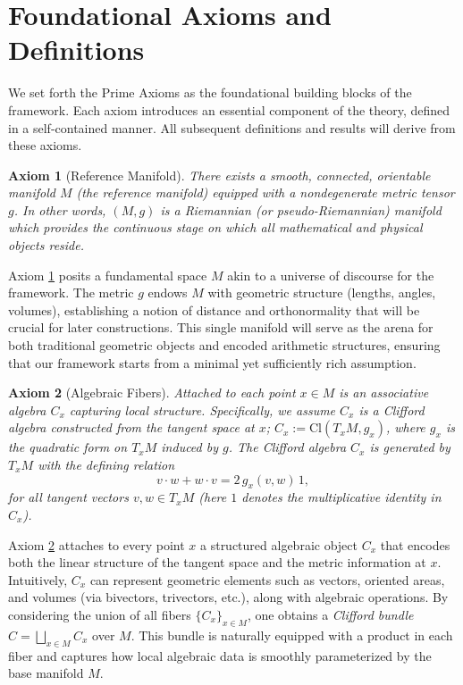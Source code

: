\documentclass[11pt]{article}
\newtheorem{axiom}{Axiom}
\begin{document}
\section{Foundational Axioms and Definitions}
We set forth the Prime Axioms as the foundational building blocks of the framework. Each axiom introduces an essential component of the theory, defined in a self-contained manner. All subsequent definitions and results will derive from these axioms.

\begin{axiom}[Reference Manifold]\label{ax:manifold}
There exists a smooth, connected, orientable manifold $M$ (the \emph{reference manifold}) equipped with a nondegenerate metric tensor $g$. In other words, $(M,g)$ is a Riemannian (or pseudo-Riemannian) manifold which provides the continuous stage on which all mathematical and physical objects reside.
\end{axiom}

Axiom \ref{ax:manifold} posits a fundamental space $M$ akin to a universe of discourse for the framework. The metric $g$ endows $M$ with geometric structure (lengths, angles, volumes), establishing a notion of distance and orthonormality that will be crucial for later constructions. This single manifold will serve as the arena for both traditional geometric objects and encoded arithmetic structures, ensuring that our framework starts from a minimal yet sufficiently rich assumption.

\begin{axiom}[Algebraic Fibers]\label{ax:fibers}
Attached to each point $x \in M$ is an associative algebra $C_x$ capturing local structure. Specifically, we assume $C_x$ is a Clifford algebra constructed from the tangent space at $x$; $C_x := \mathrm{Cl}(T_xM, g_x)$, where $g_x$ is the quadratic form on $T_xM$ induced by $g$. The Clifford algebra $C_x$ is generated by $T_xM$ with the defining relation 
\[v \cdot w + w \cdot v = 2\,g_x(v,w)\,1,\] 
for all tangent vectors $v,w \in T_xM$ (here $1$ denotes the multiplicative identity in $C_x$).
\end{axiom}

Axiom \ref{ax:fibers} attaches to every point $x$ a structured algebraic object $C_x$ that encodes both the linear structure of the tangent space and the metric information at $x$. Intuitively, $C_x$ can represent geometric elements such as vectors, oriented areas, and volumes (via bivectors, trivectors, etc.), along with algebraic operations. By considering the union of all fibers $\{C_x\}_{x\in M}$, one obtains a \emph{Clifford bundle} $C = \bigsqcup_{x\in M} C_x$ over $M$. This bundle is naturally equipped with a product in each fiber and captures how local algebraic data is smoothly parameterized by the base manifold $M$.
\end{document}
